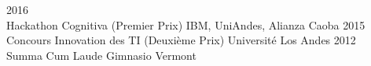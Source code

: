 \documentclass[francais]{cv-style}          %
\begin{document}
\begin{entrylist}
\entry
{2016\\\vspace{-0.3cm}}
{Hackathon Cognitiva (Premier Prix)}
{IBM, UniAndes, Alianza Caoba}
{\vspace{-0.3cm}}
\entry
{2015\\\vspace{-0.3cm}}
{Concours Innovation des TI (Deuxième Prix)}
{Université Los Andes}
{\vspace{-0.3cm}}
\entry
{2012\\\vspace{-0.5cm}}
{Summa Cum Laude}
{Gimnasio Vermont}
{\vspace{-0.5cm}}
\end{entrylist}
\end{document}

